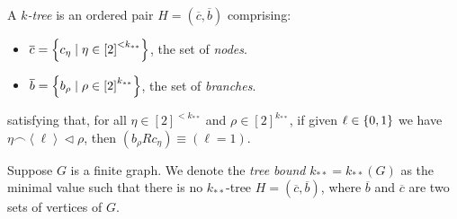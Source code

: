 
    \label{k-tree}
        A \emph{$k$-tree} is an ordered pair $H = (\overline{c},\overline{b})$ comprising:
        \begin{itemize}
            \item $\overline{c} = \left\{  c_\eta \mid \eta \in \left[ 2 \right]^{<k_{**}}  \right\}$, the set of \emph{nodes}.
            \item $\overline{b} = \left\{  b_\rho \mid \rho \in \left[ 2 \right]^{k_{**}}  \right\}$, the set of \emph{branches}.
        \end{itemize}
        satisfying that, for all $\eta \in \left[ 2 \right]^{<k_{**}}$ and $\rho \in \left[ 2 \right]^{k_{**}}$,
        if given $\ell \in \left\{ 0, 1 \right\}$ we have $\eta \frown \left< \ell \right> \triangleleft \rho$, then
        $\left( b_\rho R c_\eta \right) \equiv \left( \ell = 1 \right)$.

    \label{tree_bound}
        Suppose $G$ is a finite graph.
        We denote the \emph{tree bound} $k_{**} = k_{**}(G)$ as the minimal value such that there is no $k_{**}$-tree
        $H = (\overline{c},\overline{b})$, where $\overline{b}$ and $\overline{c}$ are two sets of vertices of $G$.

